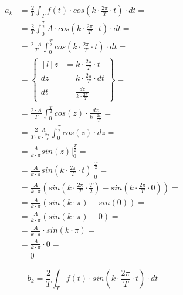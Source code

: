 \begin{task}
\begin{align*}
a_k&=\frac{2}{T}\int_{T}f(t) \cdot cos\left( k \cdot \frac{2\pi}{T} \cdot t\right) \cdot dt=\\
&=\frac{2}{T}\int_{0}^{\frac{T}{2}}A \cdot cos\left( k \cdot \frac{2\pi}{T} \cdot t\right) \cdot dt=\\
&=\frac{2\cdot A}{T}\int_{0}^{\frac{T}{2}} cos\left( k \cdot \frac{2\pi}{T} \cdot t\right) \cdot dt=\\
&=\begin{Bmatrix*}[l]
z&=k\cdot \frac{2\pi}{T} \cdot t\\
dz&=k\cdot \frac{2\pi}{T} \cdot dt\\
dt&=\frac{dz}{k\cdot \frac{2\pi}{T}}
\end{Bmatrix*}=\\
&=\frac{2\cdot A}{T}\int_{0}^{\frac{T}{2}} cos\left( z\right) \cdot \frac{dz}{k\cdot \frac{2\pi}{T}}=\\
&=\frac{2\cdot A}{T \cdot k\cdot \frac{2\pi}{T}}\int_{0}^{\frac{T}{2}} cos\left( z\right) \cdot dz=\\
&=\frac{A}{k\cdot \pi}\left. sin\left( z\right) \right|_{0}^{\frac{T}{2}}=\\
&=\frac{A}{k\cdot \pi}\left. sin\left( k\cdot \frac{2\pi}{T} \cdot t\right) \right|_{0}^{\frac{T}{2}}=\\
&=\frac{A}{k\cdot \pi}\left( sin\left( k\cdot \frac{2\pi}{T} \cdot \frac{T}{2}\right) - sin\left( k\cdot \frac{2\pi}{T} \cdot 0\right)\right)=\\
&=\frac{A}{k\cdot \pi}\left( sin\left( k\cdot \pi \right) - sin\left( 0\right)\right)=\\
&=\frac{A}{k\cdot \pi}\left( sin\left( k\cdot \pi \right) - 0\right)=\\
&=\frac{A}{k\cdot \pi}\cdot sin\left( k\cdot \pi \right)=\\
&=\frac{A}{k\cdot \pi}\cdot 0=\\
&=0
\end{align*}




\begin{equation}
b_k=\frac{2}{T}\int_{T}f(t) \cdot sin\left( k \cdot \frac{2\pi}{T} \cdot t\right) \cdot dt
\end{equation}



\end{task}
